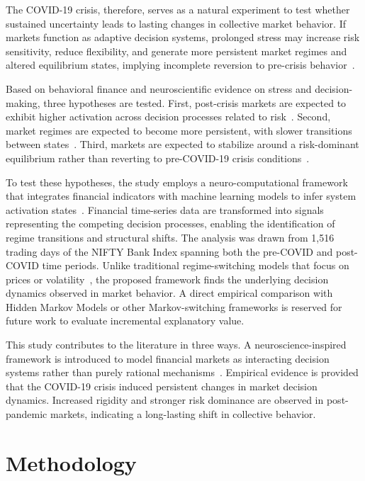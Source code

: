 \documentclass[runningheads,10pt]{llncs}
\begin{document}
The COVID-19 crisis, therefore, serves as a natural experiment to test whether sustained uncertainty leads to lasting changes in collective market behavior. If markets function as adaptive decision systems, prolonged stress may increase risk sensitivity, reduce flexibility, and generate more persistent market regimes and altered equilibrium states, implying incomplete reversion to pre-crisis behavior~\cite{lo2004}.

Based on behavioral finance and neuroscientific evidence on stress and decision-making, three hypotheses are tested. First, post-crisis markets are expected to exhibit higher activation across decision processes related to risk~\cite{coates2012}. Second, market regimes are expected to become more persistent, with slower transitions between states~\cite{hamilton1989}. Third, markets are expected to stabilize around a risk-dominant equilibrium rather than reverting to pre-COVID-19 crisis conditions~\cite{kahneman1979}.

To test these hypotheses, the study employs a neuro-computational framework that integrates financial indicators with machine learning models to infer system activation states~\cite{gu2020,baker2020}. Financial time-series data are transformed into signals representing the competing decision processes, enabling the identification of regime transitions and structural shifts. The analysis was drawn from 1,516 trading days of the NIFTY Bank Index spanning both the pre-COVID and post-COVID time periods. Unlike traditional regime-switching models that focus on prices or volatility~\cite{hamilton1989}, the proposed framework finds the underlying decision dynamics observed in market behavior. A direct empirical comparison with Hidden Markov Models or other Markov-switching frameworks is reserved for future work to evaluate incremental explanatory value.

This study contributes to the literature in three ways. A neuroscience-inspired framework is introduced to model financial markets as interacting decision systems rather than purely rational mechanisms~\cite{kahneman1979}. Empirical evidence is provided that the COVID-19 crisis induced persistent changes in market decision dynamics. Increased rigidity and stronger risk dominance are observed in post-pandemic markets, indicating a long-lasting shift in collective behavior.

\vspace{-10pt}
\section{Methodology}
\end{document}
